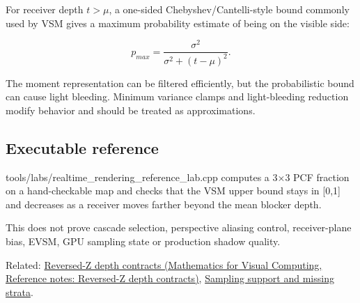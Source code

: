 For receiver depth \(t>\mu\), a one-sided Chebyshev/Cantelli-style bound commonly used by VSM gives a maximum probability estimate of being on the visible side:

\[
p_{max}
=
\frac{\sigma^2}
{\sigma^2+(t-\mu)^2}.
\]

The moment representation can be filtered efficiently, but the probabilistic bound can cause light bleeding. Minimum variance clamps and light-bleeding reduction modify behavior and should be treated as approximations.

\subsection{Executable reference}\label{appendix-7cac8a689849-executable-reference}

\hypertarget{appendix-7cac8a689849-executable-reference}{}

tools/labs/realtime\_rendering\_reference\_lab.cpp computes a 3×3 PCF fraction on a hand-checkable map and checks that the VSM upper bound stays in {[}0,1{]} and decreases as a receiver moves farther beyond the mean blocker depth.

This does not prove cascade selection, perspective aliasing control, receiver-plane bias, EVSM, GPU sampling state or production shadow quality.

Related: \href{../02-Mathematics-for-Visual-Computing/main.pdf\#nameddest=appendix-275ec8847057}{Reversed-Z depth contracts (Mathematics for Visual Computing, Reference notes: Reversed-Z depth contracts)}, \hyperref[appendix-10308c3d753e]{Sampling support and missing strata}.
